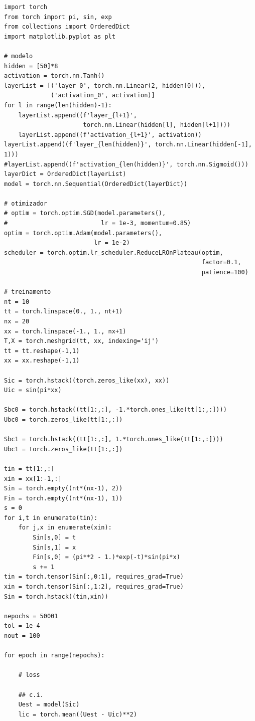 \begin{lstlisting}[caption=mlp\_calor\_autograd.py]
import torch
from torch import pi, sin, exp
from collections import OrderedDict
import matplotlib.pyplot as plt

# modelo
hidden = [50]*8
activation = torch.nn.Tanh()
layerList = [('layer_0', torch.nn.Linear(2, hidden[0])),
             ('activation_0', activation)]
for l in range(len(hidden)-1):
    layerList.append((f'layer_{l+1}',
                      torch.nn.Linear(hidden[l], hidden[l+1])))
    layerList.append((f'activation_{l+1}', activation))
layerList.append((f'layer_{len(hidden)}', torch.nn.Linear(hidden[-1], 1)))
#layerList.append((f'activation_{len(hidden)}', torch.nn.Sigmoid()))
layerDict = OrderedDict(layerList)
model = torch.nn.Sequential(OrderedDict(layerDict))

# otimizador
# optim = torch.optim.SGD(model.parameters(),
#                          lr = 1e-3, momentum=0.85)
optim = torch.optim.Adam(model.parameters(),
                         lr = 1e-2)
scheduler = torch.optim.lr_scheduler.ReduceLROnPlateau(optim,
                                                       factor=0.1,
                                                       patience=100)

# treinamento
nt = 10
tt = torch.linspace(0., 1., nt+1)
nx = 20
xx = torch.linspace(-1., 1., nx+1)
T,X = torch.meshgrid(tt, xx, indexing='ij')
tt = tt.reshape(-1,1)
xx = xx.reshape(-1,1)

Sic = torch.hstack((torch.zeros_like(xx), xx))
Uic = sin(pi*xx)

Sbc0 = torch.hstack((tt[1:,:], -1.*torch.ones_like(tt[1:,:])))
Ubc0 = torch.zeros_like(tt[1:,:])

Sbc1 = torch.hstack((tt[1:,:], 1.*torch.ones_like(tt[1:,:])))
Ubc1 = torch.zeros_like(tt[1:,:])

tin = tt[1:,:]
xin = xx[1:-1,:]
Sin = torch.empty((nt*(nx-1), 2))
Fin = torch.empty((nt*(nx-1), 1))
s = 0
for i,t in enumerate(tin):
    for j,x in enumerate(xin):
        Sin[s,0] = t
        Sin[s,1] = x
        Fin[s,0] = (pi**2 - 1.)*exp(-t)*sin(pi*x)
        s += 1
tin = torch.tensor(Sin[:,0:1], requires_grad=True)
xin = torch.tensor(Sin[:,1:2], requires_grad=True)
Sin = torch.hstack((tin,xin))

nepochs = 50001
tol = 1e-4
nout = 100

for epoch in range(nepochs):

    # loss

    ## c.i.
    Uest = model(Sic)
    lic = torch.mean((Uest - Uic)**2)
    

\end{lstlisting}
